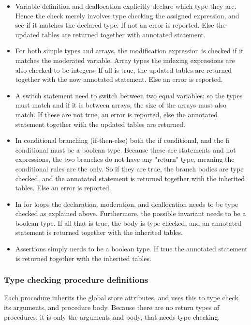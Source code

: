 \begin{itemize}
    \item Variable definition and deallocation explicitly declare which type they are. Hence
          the check merely involves type checking the assigned expression, and see if it matches
          the declared type. If not an error is reported. Else the updated tables are returned
          together with annotated statement.

    \item For both simple types and arrays, the modification expression is checked if it matches
          the moderated variable. Array types the indexing expressions are also checked
          to be integers. If all is true, the updated tables are returned together with
          the now annotated statement. Else an error is reported.      

    \item A switch statement need to switch between two equal variables; so the types must match
          and if it is between arrays, the size of the arrays must also match. If these are not
          true, an error is reported, else the annotated statement together with the updated
          tables are returned.

    \item In conditional branching (if-then-else) both the if conditional, and the fi conditional
          must be a boolean type. Because these are statements and not expressions, the two
          branches do not have any "return" type, meaning the conditional rules are the only.
          So if they are true, the branch bodies are type checked, and the annotated statement
          is returned together with the inherited tables. Else an error is reported.

    \item In for loops the declaration, moderation, and deallocation needs to be type checked
          as explained above. Furthermore, the possible invariant needs to be a boolean type.
          If all that is true, the body is type checked, and an annotated statement is returned
          together with the inherited tables.

    \item Assertions simply needs to be a boolean type. If true the annotated statement is returned
          together with the inherited tables.
\end{itemize}


\subsubsection{Type checking procedure definitions}
Each procedure inherits the global store attributes, and uses this to type check its arguments,
and procedure body. Because there are no return types of procedures, it is only the arguments and
body, that needs type checking.


